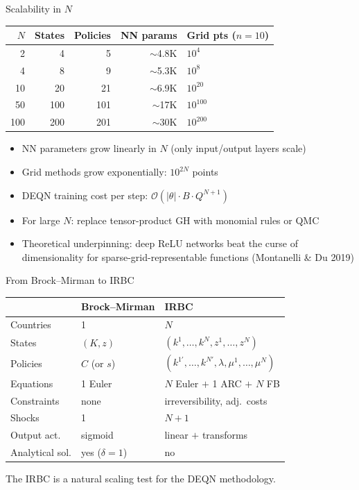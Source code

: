 \documentclass[aspectratio=169,11pt]{beamer}
\newcommand{\emphc}[1]{\textcolor{harvardcrimson}{#1}}
\begin{document}
\begin{frame}{Scalability in $N$}
\begin{center}
\begin{tabular}{rrrrl}
\toprule
$N$ & \textbf{States} & \textbf{Policies} & \textbf{NN params} & \textbf{Grid pts ($n\!=\!10$)} \\
\midrule
2 & 4 & 5 & $\sim$4.8K & $10^4$ \\
4 & 8 & 9 & $\sim$5.3K & $10^8$ \\
10 & 20 & 21 & $\sim$6.9K & $10^{20}$ \\
50 & 100 & 101 & $\sim$17K & $10^{100}$ \\
100 & 200 & 201 & $\sim$30K & $10^{200}$ \\
\bottomrule
\end{tabular}
\end{center}

\vspace{0.5em}
\begin{itemize}
    \item NN parameters grow \emphc{linearly} in $N$ (only input/output layers scale)
    \item Grid methods grow \emphc{exponentially}: $10^{2N}$ points
    \item DEQN training cost per step: $\mathcal{O}(|\theta| \cdot B \cdot Q^{N+1})$
    \item For large $N$: replace tensor-product GH with monomial rules or QMC
    \item Theoretical underpinning: \emphc{deep ReLU networks} beat the curse of dimensionality for sparse-grid-representable functions (Montanelli \& Du 2019)
\end{itemize}
\end{frame}

\begin{frame}{From Brock--Mirman to IRBC}
\begin{center}
\begin{tabular}{lll}
\toprule
& \textbf{Brock--Mirman} & \textbf{IRBC} \\
\midrule
Countries & 1 & $N$ \\
States & $(K, z)$ & $(k^1, \ldots, k^N, z^1, \ldots, z^N)$ \\
Policies & $C$ (or $s$) & $(k^{1\prime}, \ldots, k^{N\prime}, \lambda, \mu^1, \ldots, \mu^N)$ \\
Equations & 1 Euler & $N$ Euler $+$ 1 ARC $+$ $N$ FB \\
Constraints & none & irreversibility, adj.\ costs \\
Shocks & 1 & $N+1$ \\
Output act. & sigmoid & linear $+$ transforms \\
Analytical sol. & yes ($\delta=1$) & no \\
\bottomrule
\end{tabular}
\end{center}

\vspace{0.3em}
{\small The IRBC is a natural \emphc{scaling test} for the DEQN methodology.}
\end{frame}
\end{document}
